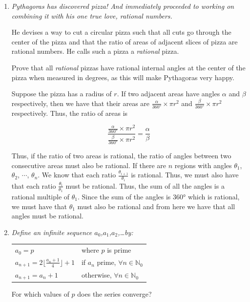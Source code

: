 \documentclass{article}
\begin{document}
\begin{enumerate}

\medskip
\item %
{\itshape Pythagoras has discovered pizza! And immediately proceeded to working on combining it with his one true love, rational numbers.

He devises a way to cut a circular pizza such that all cuts go through the center of the pizza and that the ratio of areas of adjacent slices of pizza are rational numbers. He calls such a pizza a \textit{rational} pizza.

Prove that all \textit{rational} pizzas have rational internal angles at the center of the pizza when measured in degrees, as this will make Pythagoras very happy.
}

Suppose the pizza has a radius of $r$. If two adjacent areas have angles $\alpha$ and $\beta$ respectively, then we have that their areas are $\frac{\alpha}{360 \si{\degree}} \times \pi r^2$ and $\frac{\beta}{360 \si{\degree}} \times \pi r^2$ respectively. Thus, the ratio of areas is

$$\frac{\frac{\alpha}{360 \si{\degree}} \times \pi r^2}{\frac{\beta}{360 \si{\degree}} \times \pi r^2} = \frac{\alpha}{\beta} $$

Thus, if the ratio of two areas is rational, the ratio of angles between two consecutive areas must also be rational. If there are $n$ regions with angles $\theta_1$, $\theta_2$, $\cdots$, $\theta_n$. We know that each ratio $\frac{\theta_{i + 1}}{\theta_i}$ is rational. Thus, we must also have that each ratio $\frac{\theta_i}{\theta_1}$ must be rational. Thus, the sum of all the angles is a rational multiple of $\theta_1$. Since the sum of the angles is $360 \si{\degree}$ which is rational, we must have that $\theta_1$ must also be rational and from here we have that all angles must be rational.

\medskip
\item %
{\itshape Define an infinite sequence $a_0$,$a_1$,$a_2$,\ldots by:
\begin{center}
\begin{tabular}{ l l }
    $a_0 = p$ & where $p$ is prime
    \\$a_{n+1} = 2\lfloor \frac{a_n+1}{4}\rfloor + 1$ & if $a_n$ prime, $\forall n \in \mathbb{N}_0$
    \\$a_{n+1} = a_{n} + 1$ & otherwise, $\forall n \in \mathbb{N}_0$
    
\end{tabular}
\end{center}
For which values of $p$ does the series converge?
}


\end{enumerate}
\end{document}
